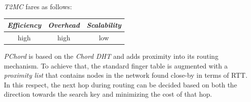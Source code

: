 %
\emph{T2MC} fares as follows:
\begin{center}
{\footnotesize
\begin{tabular}{ccc}
\emph{Efficiency} & \emph{Overhead} & \emph{Scalability} \\
\hline
high &
high &
low
\end{tabular}
}
\end{center}

\emph{PChord} \cite{HLYW2005} is based on the \emph{Chord DHT} and adds
proximity into its routing mechanism. 
To achieve that, the standard finger table
is augmented with a \emph{proximity list} that contains
nodes in the network found close-by in terms of RTT.
In this respect, the next hop during routing can be decided based on both the
direction towards the search key and minimizing the cost of that hop.

